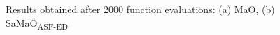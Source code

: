 \documentclass[onecolumn,10pt]{asme2ej}
\begin{document}
\begin{figure}[!htb]
	\centering    
	\caption{Results obtained after 2000 function evaluations: (a) MaO, (b) SaMaO\textsubscript{ASF-ED}}
	\label{fig:2000}
\end{figure}
 
\end{document}
